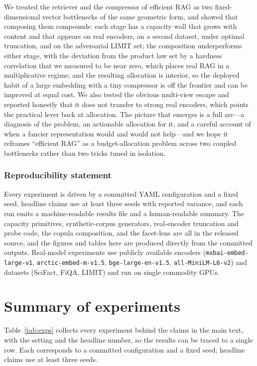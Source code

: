 \documentclass{article}
\begin{document}
We treated the retriever and the compressor of efficient RAG as two fixed-dimensional vector
bottlenecks of the same geometric form, and showed that composing them compounds: each stage has a
capacity wall that grows with content and that appears on real encoders, on a second dataset, under
optimal truncation, and on the adversarial LIMIT set; the composition underperforms either stage,
with the deviation from the product law set by a hardness correlation that we measured to be near
zero, which places real RAG in a multiplicative regime; and the resulting allocation is interior,
so the deployed habit of a large embedding with a tiny compressor is off the frontier and can be
improved at equal cost. We also tested the obvious multi-view escape and reported honestly that it
does not transfer to strong real encoders, which points the practical lever back at allocation. The
picture that emerges is a full arc---a diagnosis of the problem, an actionable allocation for it, and
a careful account of when a fancier representation would and would not help---and we hope it reframes
``efficient RAG'' as a budget-allocation problem across two coupled bottlenecks rather than two
tricks tuned in isolation.

\subsubsection*{Reproducibility statement}
Every experiment is driven by a committed YAML configuration and a fixed seed, headline claims use
at least three seeds with reported variance, and each run emits a machine-readable results file and
a human-readable summary. The capacity primitives, synthetic-corpus generators, real-encoder
truncation and probe code, the copula composition, and the facet-lens are all in the released
source, and the figures and tables here are produced directly from the committed outputs. Real-model
experiments use publicly available encoders (\texttt{mxbai-embed-large-v1},
\texttt{arctic-embed-m-v1.5}, \texttt{bge-large-en-v1.5}, \texttt{all-MiniLM-L6-v2}) and datasets
(SciFact, FiQA, LIMIT) and run on single commodity GPUs.




\appendix
\section{Summary of experiments}
\label{app:experiments}

Table~\ref{tab:exps} collects every experiment behind the claims in the main text, with the
setting and the headline number, so the results can be traced to a single row. Each corresponds to
a committed configuration and a fixed seed; headline claims use at least three seeds.
\end{document}
